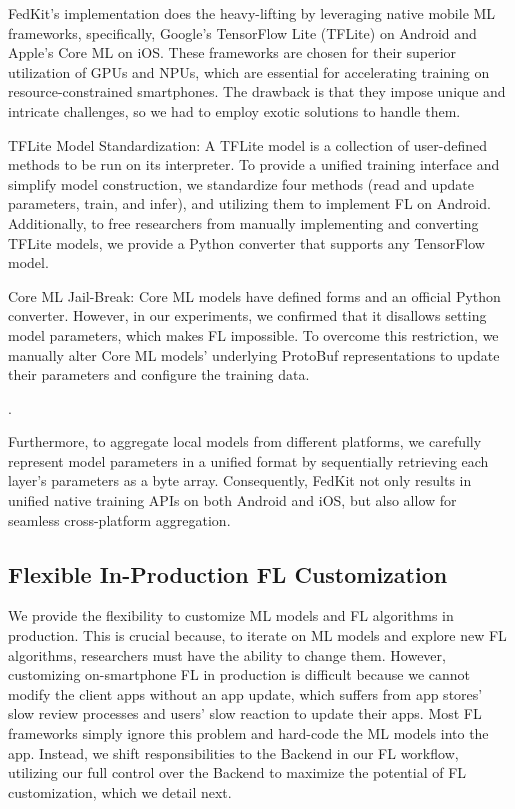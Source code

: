 \documentclass[letterpaper]{article} %
\begin{document}
FedKit's implementation does the heavy-lifting by leveraging
native mobile ML frameworks, specifically,
Google's TensorFlow Lite (TFLite) on Android and Apple's Core ML on iOS.
These frameworks are chosen for their superior utilization of GPUs and NPUs,
which are essential for accelerating training on resource-constrained smartphones.
The drawback is that they impose unique and intricate challenges,
so we had to employ exotic solutions to handle them.
\begin{enumerate*}[label=\arabic*)]
    \item TFLite Model Standardization:
        A TFLite model is a collection of user-defined methods to be run on
        its interpreter.
        To provide a unified training interface and simplify model construction,
        we standardize four methods
        (read and update parameters, train, and infer),
        and utilizing them to implement FL on Android.
        Additionally, to free researchers from manually implementing and
        converting TFLite models,
        we provide a Python converter that supports any TensorFlow model.
    \item Core ML Jail-Break:
        Core ML models have defined forms and an official Python converter.
        However, in our experiments, we confirmed that
        it disallows setting model parameters,
        which makes FL impossible.
        To overcome this restriction, we manually alter
        Core ML models' underlying ProtoBuf representations to
        update their parameters and configure the training data.
\end{enumerate*}.

Furthermore, to aggregate local models from different platforms,
we carefully represent model parameters in a unified format by
sequentially retrieving each layer's parameters as a byte array.
Consequently,
FedKit not only results in unified native training APIs on
both Android and iOS, but also
allow for seamless cross-platform aggregation.

\subsection{Flexible In-Production FL Customization}
\newcommand{\model}{$M$}
\newcommand{\fs}{$S_\mathrm F$}
We provide the flexibility to customize ML models and FL algorithms
in production.
This is crucial because, to iterate on ML models and explore new FL algorithms,
researchers must have the ability to change them.
However, customizing on-smartphone FL in production is difficult because
we cannot modify the client apps without an app update,
which suffers from app stores' slow review processes and
users' slow reaction to update their apps.
Most FL frameworks simply ignore this problem and
hard-code the ML models into the app.
Instead, we shift responsibilities to the Backend in our FL workflow,
utilizing our full control over the Backend to
maximize the potential of FL customization,
which we detail next.
\end{document}
